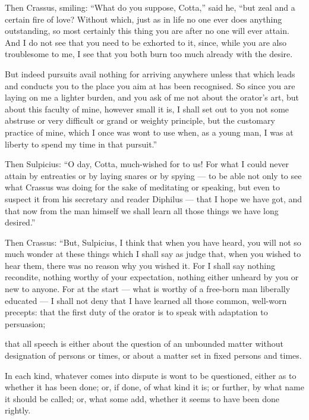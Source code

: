  Then Crassus, smiling: ``What do you suppose, Cotta,'' said he, ``but zeal and a certain fire of love? Without which, just as in life no one ever does anything outstanding, so most certainly this thing you are after no one will ever attain. And I do not see that you need to be exhorted to it, since, while you are also troublesome to me, I see that you both burn too much already with the desire.

 But indeed pursuits avail nothing for arriving anywhere unless that which leads and conducts you to the place you aim at has been recognised. So since you are laying on me a lighter burden, and you ask of me not about the orator's art, but about this faculty of mine, however small it is, I shall set out to you not some abstruse or very difficult or grand or weighty principle, but the customary practice of mine, which I once was wont to use when, as a young man, I was at liberty to spend my time in that pursuit.''

 Then Sulpicius: ``O day, Cotta, much-wished for to us! For what I could never attain by entreaties or by laying snares or by spying — to be able not only to see what Crassus was doing for the sake of meditating or speaking, but even to suspect it from his secretary and reader Diphilus — that I hope we have got, and that now from the man himself we shall learn all those things we have long desired.''

 Then Crassus: ``But, Sulpicius, I think that when you have heard, you will not so much wonder at these things which I shall say as judge that, when you wished to hear them, there was no reason why you wished it. For I shall say nothing recondite, nothing worthy of your expectation, nothing either unheard by you or new to anyone. For at the start — what is worthy of a free-born man liberally educated — I shall not deny that I have learned all those common, well-worn precepts: that the first duty of the orator is to speak with adaptation to persuasion;

 that all speech is either about the question of an unbounded matter without designation of persons or times, or about a matter set in fixed persons and times.

 In each kind, whatever comes into dispute is wont to be questioned, either as to whether it has been done; or, if done, of what kind it is; or further, by what name it should be called; or, what some add, whether it seems to have been done rightly.

